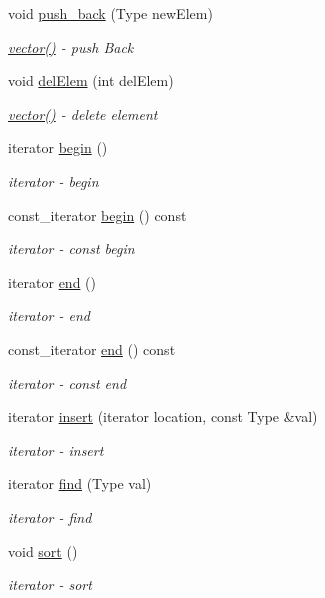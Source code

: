 \begin{DoxyCompactItemize}
void \hyperlink{classvector_aa09467ef9ad6c97aa952cdbff9085400}{push\+\_\+back} (Type new\+Elem)
\begin{DoxyCompactList}\small\item\em \hyperlink{classvector_ab8d8ebaa9b91a05bb7a94371cb84c042}{vector()} -\/ push Back \end{DoxyCompactList}\item 
void \hyperlink{classvector_a427b0c894a09dd7d57f46b341fad95a5}{del\+Elem} (int del\+Elem)
\begin{DoxyCompactList}\small\item\em \hyperlink{classvector_ab8d8ebaa9b91a05bb7a94371cb84c042}{vector()} -\/ delete element \end{DoxyCompactList}\item 
iterator \hyperlink{classvector_a1a2e2bce9c55489fc3c65ea6956a8c8d}{begin} ()
\begin{DoxyCompactList}\small\item\em iterator -\/ begin \end{DoxyCompactList}\item 
const\+\_\+iterator \hyperlink{classvector_a4e799b72c6f027170e5ae7145746abf1}{begin} () const
\begin{DoxyCompactList}\small\item\em iterator -\/ const begin \end{DoxyCompactList}\item 
iterator \hyperlink{classvector_a37658994f03de8e7e2122a24877169f5}{end} ()
\begin{DoxyCompactList}\small\item\em iterator -\/ end \end{DoxyCompactList}\item 
const\+\_\+iterator \hyperlink{classvector_ab07ef3f43e79f9e9e5080ccaaab6cfd2}{end} () const
\begin{DoxyCompactList}\small\item\em iterator -\/ const end \end{DoxyCompactList}\item 
iterator \hyperlink{classvector_ae416d913721ccee87128230e0ff9a5fa}{insert} (iterator location, const Type \&val)
\begin{DoxyCompactList}\small\item\em iterator -\/ insert \end{DoxyCompactList}\item 
iterator \hyperlink{classvector_afd19d0871c27f1e2d216749f542cd0ca}{find} (Type val)
\begin{DoxyCompactList}\small\item\em iterator -\/ find \end{DoxyCompactList}\item 
void \hyperlink{classvector_a07b7c89f4914f1558409e81ca0fe4e72}{sort} ()
\begin{DoxyCompactList}\small\item\em iterator -\/ sort \end{DoxyCompactList}\end{DoxyCompactItemize}


